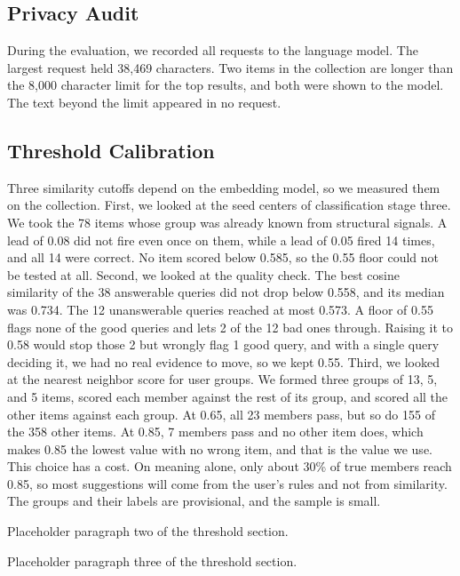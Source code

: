 \documentclass[conference]{IEEEtran}
\begin{document}
\subsection{Privacy Audit}
During the evaluation, we recorded all requests to the language model. The largest request held 38,469 characters. Two items in the collection are longer than the 8,000 character limit for the top results, and both were shown to the model. The text beyond the limit appeared in no request.

\subsection{Threshold Calibration}
Three similarity cutoffs depend on the embedding model, so we measured them on the collection. First, we looked at the seed centers of classification stage three. We took the 78 items whose group was already known from structural signals. A lead of 0.08 did not fire even once on them, while a lead of 0.05 fired 14 times, and all 14 were correct. No item scored below 0.585, so the 0.55 floor could not be tested at all. Second, we looked at the quality check. The best cosine similarity of the 38 answerable queries did not drop below 0.558, and its median was 0.734. The 12 unanswerable queries reached at most 0.573. A floor of 0.55 flags none of the good queries and lets 2 of the 12 bad ones through. Raising it to 0.58 would stop those 2 but wrongly flag 1 good query, and with a single query deciding it, we had no real evidence to move, so we kept 0.55. Third, we looked at the nearest neighbor score for user groups. We formed three groups of 13, 5, and 5 items, scored each member against the rest of its group, and scored all the other items against each group. At 0.65, all 23 members pass, but so do 155 of the 358 other items. At 0.85, 7 members pass and no other item does, which makes 0.85 the lowest value with no wrong item, and that is the value we use. This choice has a cost. On meaning alone, only about 30\% of true members reach 0.85, so most suggestions will come from the user's rules and not from similarity. The groups and their labels are provisional, and the sample is small.

Placeholder paragraph two of the threshold section.

Placeholder paragraph three of the threshold section.

\end{document}
